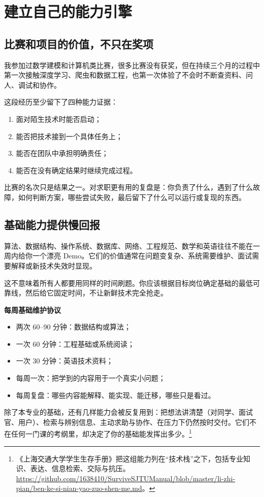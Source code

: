 \documentclass[UTF8,zihao=5,openany]{ctexbook}
\begin{document}
\chapter{建立自己的能力引擎}
\section{比赛和项目的价值，不只在奖项}
我参加过数学建模和计算机类比赛，很多比赛没有获奖，但在持续三个月的过程中第一次接触深度学习、爬虫和数据工程，也第一次体验了不会时不断查资料、问人、调试和协作。

这段经历至少留下了四种能力证据：
\begin{enumerate}
\item 面对陌生技术时能否启动；
\item 能否把技术接到一个具体任务上；
\item 能否在团队中承担明确责任；
\item 能否在没有确定结果时继续完成过程。
\end{enumerate}

比赛的名次只是结果之一。对求职更有用的复盘是：你负责了什么，遇到了什么故障，如何判断方案，哪些尝试失败，最后留下了什么可以运行或复现的东西。

\section{基础能力提供慢回报}
算法、数据结构、操作系统、数据库、网络、工程规范、数学和英语往往不能在一周内给你一个漂亮 Demo。它们的价值通常在问题变复杂、系统需要维护、面试需要解释或新技术失效时显现。

这不意味着所有人都要用同样的时间刷题。你应该根据目标岗位确定基础的最低可靠线，然后给它固定时间，不让新鲜技术完全抢走。

\begin{toolbox}
\textbf{每周基础维护协议}
\begin{itemize}
\item 两次 60--90 分钟：数据结构或算法；
\item 一次 60 分钟：工程基础或系统阅读；
\item 一次 30 分钟：英语技术资料；
\item 每周一次：把学到的内容用于一个真实小问题；
\item 每周复盘：哪些内容能解释、能实现、能迁移，哪些只是看过。
\end{itemize}
\end{toolbox}

除了本专业的基础，还有几样能力会被反复用到：把想法讲清楚（对同学、面试官、用户）、检索与辨别信息、主动求助与协作、在压力下仍然按时交付。它们不在任何一门课的考纲里，却决定了你的基础能发挥出多少。\footnote{《上海交通大学学生生存手册》把这组能力列在“技术栈”之下，包括专业知识、表达、信息检索、交际与抗压。\url{https://github.com/1638410/SurviveSJTUManual/blob/master/li-zhi-pian/ben-ke-si-nian-yao-zuo-shen-me.md}。}
\end{document}
